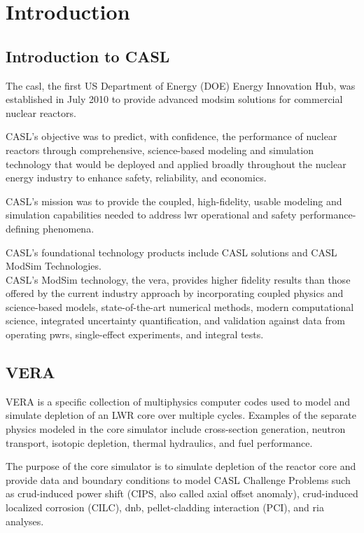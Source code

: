 
\section{Introduction}

\subsection{Introduction to CASL}
The \acrfull{casl}, the first
US Department of Energy (DOE) Energy Innovation Hub, was established in July 2010 to provide
advanced \ac{modsim} solutions for commercial nuclear reactors.

CASL's objective was to predict, with confidence, the performance of nuclear reactors
through comprehensive, science-based modeling and simulation technology that would be
deployed and applied broadly throughout the nuclear energy industry to enhance safety,
reliability, and economics.

CASL's mission was to provide the coupled, high-fidelity, usable modeling and simulation
capabilities needed to address \ac{lwr} operational and safety performance-defining phenomena.

CASL's foundational technology products include CASL solutions and CASL ModSim Technologies.\\
CASL's ModSim technology, the \ac{vera}, provides
higher fidelity results than those offered by the current industry approach by incorporating coupled physics
and science-based models, state-of-the-art numerical methods, modern computational science,
integrated uncertainty quantification, and validation against data from operating
\acp{pwr}, single-effect experiments, and integral tests.

\subsection{VERA}
VERA is a specific collection
of multiphysics computer codes used to model and simulate depletion of an LWR core over multiple cycles.
Examples of the separate physics modeled in the core simulator include cross-section generation,
neutron transport, isotopic depletion, thermal hydraulics, and fuel performance.

The purpose of the core simulator is to simulate depletion of the reactor core and provide data and boundary conditions to model
CASL Challenge Problems such as crud-induced power shift (CIPS, also called axial offset anomaly), crud-induced localized corrosion (CILC), \ac{dnb}, pellet-cladding interaction (PCI), and \ac{ria} analyses.

